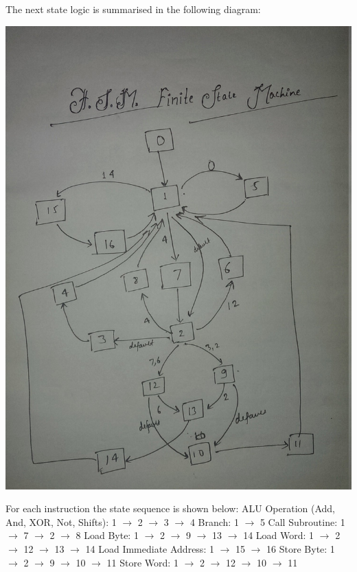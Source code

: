 \documentclass[11pt]{report}
\begin{document}
\newpage
The next state logic is summarised in the following diagram:\newline \newline
\centerline{\includegraphics[scale=0.2]{controller.jpg}} \newline \newline
For each instruction the state sequence is shown below:
\newline
ALU Operation (Add, And, XOR, Not, Shifts): 1 $\rightarrow$ 2 $\rightarrow$ 3 $\rightarrow$ 4
\newline
Branch: 1 $\rightarrow$ 5
\newline
Call Subroutine: 1 $\rightarrow$ 7 $\rightarrow$ 2 $\rightarrow$ 8
\newline
Load Byte: 1 $\rightarrow$ 2 $\rightarrow$ 9 $\rightarrow$ 13 $\rightarrow$ 14
\newline
Load Word: 1 $\rightarrow$ 2 $\rightarrow$ 12 $\rightarrow$ 13 $\rightarrow$ 14
\newline
Load Immediate Address: 1 $\rightarrow$ 15 $\rightarrow$ 16
\newline
Store Byte: 1 $\rightarrow$ 2 $\rightarrow$ 9 $\rightarrow$ 10 $\rightarrow$ 11
\newline
Store Word: 1 $\rightarrow$ 2 $\rightarrow$ 12 $\rightarrow$ 10 $\rightarrow$ 11
\newline
\end{document}
